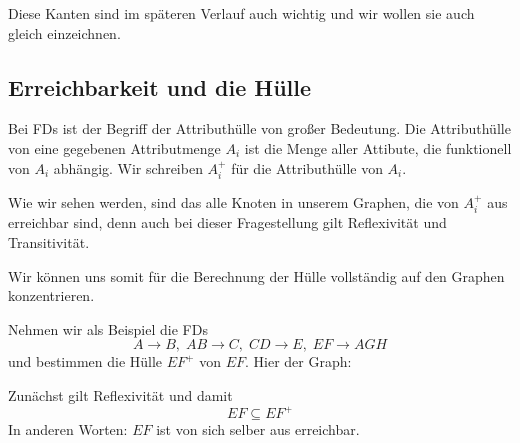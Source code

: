 \documentclass[a4paper, ngerman]{article}
\begin{document}
Diese Kanten sind im späteren Verlauf
auch wichtig und wir wollen sie auch gleich einzeichnen.
\begin{center}
\end{center}

\subsection*{Erreichbarkeit und die Hülle}
Bei FDs ist der Begriff der Attributhülle 
von großer Bedeutung.
Die Attributhülle von eine
gegebenen Attributmenge $A_i$
ist die Menge aller Attibute, 
die funktionell von $A_i$ abhängig.
Wir schreiben $A_i^+$ für die Attributhülle von $A_i$.

Wie wir sehen werden,
sind das alle Knoten in unserem Graphen,
die von $A_i^+$ aus erreichbar sind,
denn auch bei dieser Fragestellung
gilt Reflexivität und Transitivität.

Wir können uns somit für die Berechnung der Hülle
vollständig auf den Graphen konzentrieren.

Nehmen wir als Beispiel die FDs
$$
    A  \to B,\;
    AB \to C,\;
    CD \to E,\;
    EF \to AGH
$$
und bestimmen die Hülle $EF^+$ von $EF$.
Hier der Graph:
\begin{center}
\end{center}
Zunächst gilt Reflexivität und damit
$$
    EF \subseteq EF^+
$$
In anderen Worten: $EF$ ist von sich selber aus erreichbar.
\end{document}
